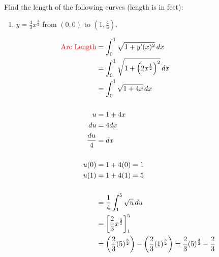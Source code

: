 \documentclass[noinstructornotes]{ximera}
\begin{document}
\begin{problem}
Find the length of the following curves (length is in feet):
	\begin{enumerate}
		\item  $y = \frac{4}{3} x^\frac{3}{2}$ from $\left( 0, 0 \right)$ to $\left( 1, \frac{4}{3} \right)$.  
		\begin{freeResponse}
			\begin{align*}
			\text{{\color{red} Arc Length}} &= \int_0^1 \sqrt{1+y'(x)^2} \,d x  \\
			&= \int_0^1 \sqrt{1+ \left( 2x^{\frac{1}{2}}\right)^2} \,d x  \\
			&=  \int_0^1 \sqrt{1+ 4x} \,d x  \\
			& \\
			u &= 1+4x\\
			du &= 4dx \\
			\frac{du}{4} &= dx \\
			& \\
			u(0) &= 1 + 4(0) =1\\
			u(1) &= 1 +4(1) = 5\\
			& \\
			&= \frac{1}{4} \int_1^5 \sqrt{u} \,d u  \\
			&= \bigg[ \frac{2}{3}x^{\frac{3}{2}} \bigg]_1^5  \\
			&= \left( \frac{2}{3}(5)^{\frac{3}{2}} \right) - \left( \frac{2}{3}(1)^{\frac{3}{2}} \right)  
			=\frac{2}{3}(5)^{\frac{3}{2}}  -  \frac{2}{3} 
			\end{align*}
		\end{freeResponse}
		
		
		

\end{enumerate}
\end{problem}
\end{document}
